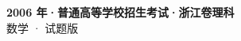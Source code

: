 \documentclass[zihao=-4, a4paper]{ctexart}
\begin{document}
\begin{center}
  {\Large\bfseries 2006 年·普通高等学校招生考试·浙江卷理科}\\[4pt]
  {\large 数学 · 试题版}
\end{center}
\medskip
{}

\end{document}
